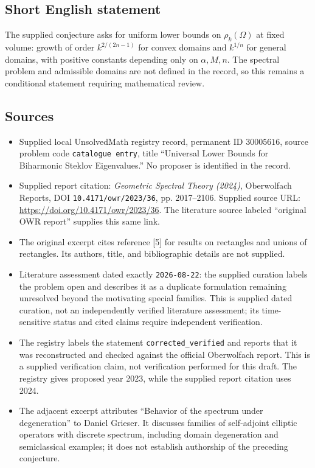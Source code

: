 \documentclass[11pt]{article}
\begin{document}
\subsection{Short English statement}
The supplied conjecture asks for uniform lower bounds on \(\rho_k(\Omega)\) at fixed volume: growth of order \(k^{2/(2n-1)}\) for convex domains and \(k^{1/n}\) for general domains, with positive constants depending only on \(\alpha,M,n\). The spectral problem and admissible domains are not defined in the record, so this remains a conditional statement requiring mathematical review.
\subsection{Sources}
\begin{itemize}
\item Supplied local UnsolvedMath registry record, permanent ID \(30005616\), source problem code \texttt{catalogue entry}, title ``Universal Lower Bounds for Biharmonic Steklov Eigenvalues.'' No proposer is identified in the record.
\item Supplied report citation: \emph{Geometric Spectral Theory (2024)}, Oberwolfach Reports, DOI \texttt{10.4171/owr/2023/36}, pp. 2017--2106. Supplied source URL: \url{https://doi.org/10.4171/owr/2023/36}. The literature source labeled ``original OWR report'' supplies this same link.
\item The original excerpt cites reference [5] for results on rectangles and unions of rectangles. Its authors, title, and bibliographic details are not supplied.
\item Literature assessment dated exactly \texttt{2026-08-22}: the supplied curation labels the problem open and describes it as a duplicate formulation remaining unresolved beyond the motivating special families. This is supplied dated curation, not an independently verified literature assessment; its time-sensitive status and cited claims require independent verification.
\item The registry labels the statement \texttt{corrected\_verified} and reports that it was reconstructed and checked against the official Oberwolfach report. This is a supplied verification claim, not verification performed for this draft. The registry gives proposed year 2023, while the supplied report citation uses 2024.
\item The adjacent excerpt attributes ``Behavior of the spectrum under degeneration'' to Daniel Grieser. It discusses families of self-adjoint elliptic operators with discrete spectrum, including domain degeneration and semiclassical examples; it does not establish authorship of the preceding conjecture.
\end{itemize}
\end{document}
